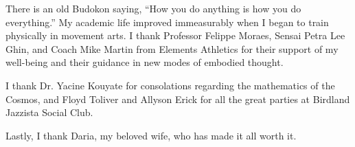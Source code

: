 \documentclass[../thesis.tex]{subfiles}
\begin{document}
 There is an old Budokon saying, ``How you do anything
 is how you do everything.''
 My academic life improved immeasurably when I began
 to train physically in movement arts.
 I thank Professor Felippe Moraes, Sensai Petra Lee Ghin,
 and Coach Mike Martin
 from Elements Athletics for
 their support of my well-being and
 their guidance in new modes of embodied thought.

 I thank Dr. Yacine Kouyate for consolations
 regarding the mathematics of the Cosmos, and Floyd Toliver
 and Allyson Erick for all the great parties at
 Birdland Jazzista Social Club.
 
 Lastly, I thank Daria, my beloved wife,
 who has made it all worth it.
\end{document}
